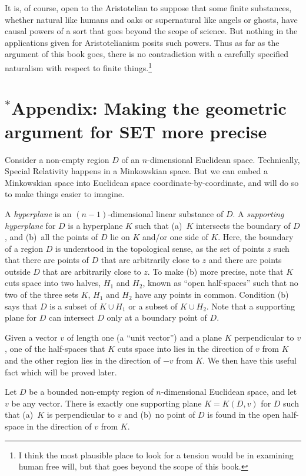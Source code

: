 It is, of course, open to the Aristotelian to suppose that some finite substances, whether natural like humans and oaks 
or  supernatural like angels or ghosts, have causal powers of a sort that goes beyond the scope of science. But nothing in the applications given for Aristotelianism
posits such powers. Thus as far as the argument of this book goes, there is no contradiction with a carefully
specified naturalism with respect to finite things.\footnote{I think the most plausible place to look for a tension 
would be in examining human free will, but that goes beyond the scope of this book.}

\section*{$^*$Appendix: Making the geometric argument for SET more precise}
Consider a non-empty region $D$ of an $n$-dimensional Euclidean space. Technically, Special Relativity happens in a 
Minkowskian space. But we can embed a Minkowskian space into Euclidean space coordinate-by-coordinate, and will do so 
to make things easier to imagine.

A \textit{hyperplane} is an $(n-1)$-dimensional linear substance of $D$. A \textit{supporting hyperplane} for $D$ is a hyperplane $K$ such that (a)~$K$ intersects the  boundary of $D$, and (b)~all the points of $D$ lie on $K$ and/or one side of $K$. Here, the boundary of a region $D$ is understood in the topological sense, as the set of points $z$ such that there are points of $D$ that are arbitrarily close to $z$ and there are points outside $D$ that are arbitrarily close to $z$. To make (b) more precise, note that $K$ cuts space into two halves, $H_1$ and $H_2$, known as “open half-spaces” such that no two of the three sets $K$, $H_1$ and $H_2$ have any points in common. Condition (b) says that $D$ is a subset of $K\cup H_1$ or a subset of $K\cup H_2$.
Note that a supporting plane for $D$ can intersect $D$ only at a boundary point of $D$. 

Given a vector $v$ of length one (a ``unit vector'') and a plane $K$ perpendicular to $v$, one of the half-spaces that $K$ cuts space into lies in the direction of $v$ from $K$ and the other region lies in the direction of $-v$ from $K$.  We then have this 
useful fact which will be proved later.

\begin{lem}\label{lem:one-supp} Let $D$ be a bounded non-empty region of $n$-dimensional Euclidean space, and let $v$ be any vector. There is exactly one supporting plane $K=K(D,v)$ for $D$ such that (a)~$K$ is perpendicular to $v$ and (b)~no point of $D$ is found in the open half-space in the direction of $v$ from $K$.
\end{lem}


